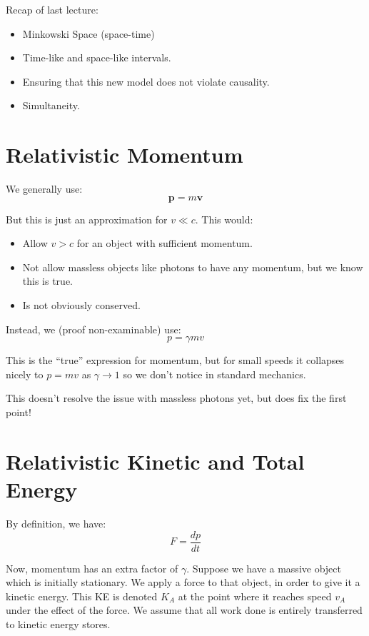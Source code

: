 
Recap of last lecture:
\begin{itemize}
    \item Minkowski Space (space-time)
    \item Time-like and space-like intervals.
    \item Ensuring that this new model does not violate causality.
    \item Simultaneity.
\end{itemize}

\section{Relativistic Momentum}
We generally use:
\[
    \pmb{p} = m \pmb{v}
\]

But this is just an approximation for $v \ll c$. This would:
\begin{itemize}
    \item Allow $v>c$ for an object with sufficient momentum.
    \item Not allow massless objects like photons to have any momentum, but we know this is true.
    \item Is not obviously conserved.
\end{itemize}

Instead, we (proof non-examinable) use:
\[
    p = \gamma m v
\]

This is the ``true'' expression for momentum, but for small speeds it collapses nicely to $p = mv$ as $\gamma \to 1$ so we don't notice in standard mechanics.

This doesn't resolve the issue with massless photons yet, but does fix the first point!

\section{Relativistic Kinetic and Total Energy}
By definition, we have:
\[
    F = \frac{dp}{dt}
\]

Now, momentum has an extra factor of $\gamma$. Suppose we have a massive object which is initially stationary. We apply a force to that object, in order to give it a kinetic energy. This KE is denoted $K_A$ at the point where it reaches speed $v_A$ under the effect of the force. We assume that all work done is entirely transferred to kinetic energy stores.

